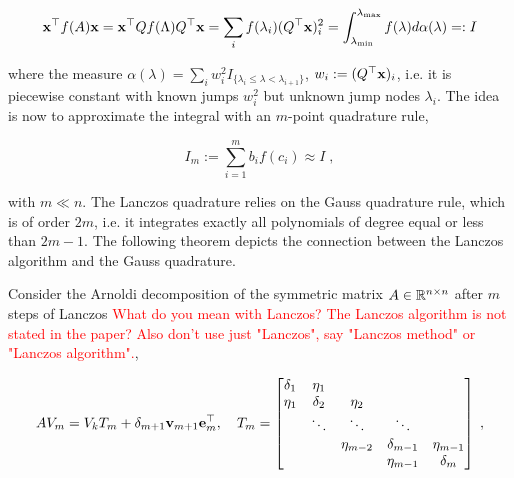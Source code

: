 \documentclass{article}
\begin{document}
{\begin{equation*}
    \boldsymbol{\mathbf{x}}^\top f(A) \boldsymbol{\mathbf{x}} = \boldsymbol{\mathbf{x}}^\top Q f(\Lambda) Q^\top \boldsymbol{\mathbf{x}} = \sum_i f(\lambda_i) (Q^\top \boldsymbol{\mathbf{x}})_i^2 = \int_{\lambda_{\min}}^{\lambda_{\max}} f(\lambda) d \alpha(\lambda) =: I
\end{equation*}

where the measure $\alpha(\lambda) = \sum_i w_i^2 I_{\{\lambda_i \le \lambda < \lambda_{i+1}\}}$, $w_i := (Q^\top \boldsymbol{\mathbf{x}})_i$, i.e. it is piecewise constant with known jumps $w_i^2$ but unknown jump nodes $\lambda_i$. The idea is now to approximate the integral with an $m$-point quadrature rule,

\begin{equation} \label{eq:gauss_quadrature}
    I_m := \sum_{i=1}^m b_i f(c_i) \approx I \; ,
\end{equation}

with $m \ll n$. The Lanczos quadrature relies on the Gauss quadrature rule, which is of order $2m$, i.e. it integrates exactly all polynomials of degree equal or less than $2m -1$. The following theorem depicts the connection between the Lanczos algorithm and the Gauss quadrature.

\begin{theorem} \label{thm:lanczos_quadrature}
Consider the Arnoldi decomposition of the symmetric matrix $A \in \mathbb R^{n\times n}$ after $m$ steps of Lanczos \textcolor{red}{What do you mean with Lanczos? The Lanczos algorithm is not stated in the paper? Also don't use just "Lanczos", say "Lanczos method" or "Lanczos algorithm".},

\begin{equation} \label{eq:arnoldi_decomp_lanczos}
    A V_m = V_k T_m + \delta_{m+1} \vect v_{m+1} \vect e_m^\top, \quad T_m = \begin{bmatrix}
        \delta_1 & \eta_1   &              &               & \\
        \eta_1   & \delta_2 & \eta_2       &               & \\
                 & \ddots   & \ddots       & \ddots        & \\
                 &          & \eta_{m-2}   & \delta_{m-1}  & \eta_{m-1} \\
                 &          &              & \eta_{m-1}   & \delta_m
    \end{bmatrix} \;,\makeatletter
\def\algbackskip{\hskip-\ALG@thistlm}
\makeatother
\end{equation}


\end{theorem}}
\end{document}
